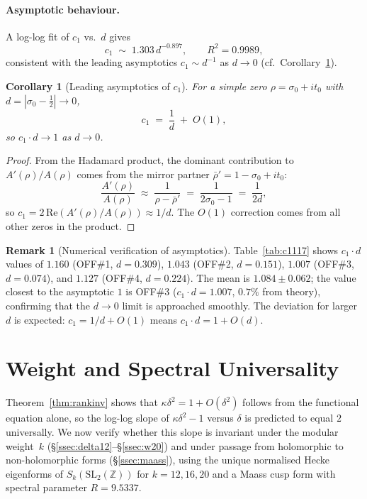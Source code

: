 \documentclass[11pt, a4paper]{article}
\theoremstyle{plain}
\newtheorem{corollary}[theorem]{Corollary}
\theoremstyle{definition}
\newtheorem{remark}{Remark}[section]
\begin{document}
\paragraph{Asymptotic behaviour.}
A log-log fit of $c_{1}$ vs.\ $d$ gives
\[
  c_{1} \;\sim\; 1.303\,d^{-0.897}, \qquad R^{2}=0.9989,
\]
consistent with the leading asymptotics $c_{1}\sim d^{-1}$ as $d\to 0$
(cf.\ Corollary~\ref{cor:asym}).

\begin{corollary}[Leading asymptotics of $c_{1}$]
\label{cor:asym}
  For a simple zero $\rho=\sigma_{0}+it_{0}$ with $d=|\sigma_{0}-\tfrac{1}{2}|
  \to 0$,
  \[
    c_{1} \;=\; \frac{1}{d} \;+\; O(1),
  \]
  so $c_{1}\cdot d \to 1$ as $d\to 0$.
\end{corollary}

\begin{proof}
  From the Hadamard product, the dominant contribution to
  $A'(\rho)/A(\rho)$ comes from the mirror partner $\bar\rho' = 1-\sigma_{0}+it_{0}$:
  \[
    \frac{A'(\rho)}{A(\rho)} \;\approx\; \frac{1}{\rho-\bar\rho'}
    \;=\; \frac{1}{2\sigma_{0}-1} \;=\; \frac{1}{2d},
  \]
  so $c_{1}=2\,\mathrm{Re}(A'(\rho)/A(\rho))\approx 1/d$.
  The $O(1)$ correction comes from all other zeros in the product.
\end{proof}

\begin{remark}[Numerical verification of asymptotics]
  Table~\ref{tab:c1117} shows $c_{1}\cdot d$ values of
  $1.160$ (OFF\#1, $d=0.309$), $1.043$ (OFF\#2, $d=0.151$),
  $1.007$ (OFF\#3, $d=0.074$), and $1.127$ (OFF\#4, $d=0.224$).
  The mean is $1.084\pm 0.062$; the value closest to the asymptotic
  $1$ is OFF\#3 ($c_{1}\cdot d = 1.007$, $0.7\%$ from theory),
  confirming that the $d\to 0$ limit is approached smoothly.
  The deviation for larger $d$ is expected: $c_{1}=1/d+O(1)$ means
  $c_{1}\cdot d = 1 + O(d)$.
\end{remark}


\section{Weight and Spectral Universality}
\label{sec:modular}

Theorem~\ref{thm:rankinv} shows that $\kappa\delta^{2}=1+O(\delta^{2})$
follows from the functional equation alone, so the log-log slope of
$\kappa\delta^{2}-1$ versus $\delta$ is predicted to equal $2$ universally.
We now verify whether this slope is invariant under the modular weight~$k$
(\S\ref{ssec:delta12}--\S\ref{ssec:w20})
and under passage from holomorphic to non-holomorphic forms
(\S\ref{ssec:maass}), using the unique normalised Hecke eigenforms of
$S_k(\mathrm{SL}_2(\mathbb{Z}))$ for $k=12,16,20$ and a Maass cusp form
with spectral parameter $R=9.5337$.
\end{document}
